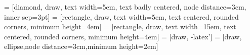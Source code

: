\documentclass{article}
\begin{document}
\newcommand{\mcode} {\texttt{GS\_MotherCode.r}}
\newcommand{\bigtt}[1] {\textcolor{darkblue}{{\large {\texttt{#1}}}}}
\renewcommand{\tablename}{Tableau}


\tableofcontents

 = [diamond, draw,
    text width=5em, text badly centered, node distance=3cm, inner sep=3pt]
 = [rectangle, draw,
    text width=5em, text centered, rounded corners, minimum height=4em]
 = [rectangle, draw,
    text width=15em, text centered, rounded corners, minimum height=4em]
 = [draw, -latex']
 = [draw, ellipse,node distance=3cm,minimum height=2em]
\end{document}
